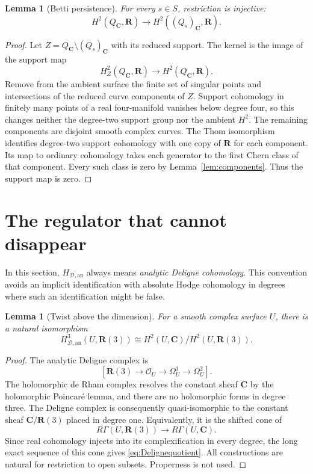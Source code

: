 \documentclass[11pt,a4paper]{article}
\newtheorem{lemma}[theorem]{Lemma}
\theoremstyle{remark}
\newcommand{\R}{\mathbf R}
\newcommand{\C}{\mathbf C}
\newcommand{\OO}{\mathcal O}
\newcommand{\HD}{H_{\mathcal D,\mathrm{an}}}
\begin{document}
\begin{lemma}[Betti persistence]\label{lem:Betti}
For every $s\in S$, restriction is injective:
\[
H^2(Q_{\C},\R)\longrightarrow H^2((Q_s)_{\C},\R).
\]
\end{lemma}
\begin{proof}
Let $Z=Q_{\C}\setminus(Q_s)_{\C}$ with its reduced support. The kernel is the image of the support map
\[
H_Z^2(Q_{\C},\R)\longrightarrow H^2(Q_{\C},\R).
\]
Remove from the ambient surface the finite set of singular points and intersections of the reduced curve components of $Z$. Support cohomology in finitely many points of a real four-manifold vanishes below degree four, so this changes neither the degree-two support group nor the ambient $H^2$. The remaining components are disjoint smooth complex curves. The Thom isomorphism identifies degree-two support cohomology with one copy of $\R$ for each component. Its map to ordinary cohomology takes each generator to the first Chern class of that component. Every such class is zero by Lemma~\ref{lem:components}. Thus the support map is zero.
\end{proof}

\section{The regulator that cannot disappear}

In this section, $\HD$ always means \emph{analytic Deligne cohomology}. This convention avoids an implicit identification with absolute Hodge cohomology in degrees where such an identification might be false.

\begin{lemma}[Twist above the dimension]\label{lem:Deligne}
For a smooth complex surface $U$, there is a natural isomorphism
\begin{equation}\label{eq:Delignequotient}
\HD^3(U,\R(3))
\cong H^2(U,\C)/H^2(U,\R(3)).
\end{equation}
\end{lemma}
\begin{proof}
The analytic Deligne complex is
\[
[\R(3)\longrightarrow\OO_U\longrightarrow\Omega_U^1\longrightarrow\Omega_U^2].
\]
The holomorphic de Rham complex resolves the constant sheaf $\C$ by the holomorphic Poincar\'e lemma, and there are no holomorphic forms in degree three. The Deligne complex is consequently quasi-isomorphic to the constant sheaf $\C/\R(3)$ placed in degree one. Equivalently, it is the shifted cone of
\[
R\Gamma(U,\R(3))\longrightarrow R\Gamma(U,\C).
\]
Since real cohomology injects into its complexification in every degree, the long exact sequence of this cone gives \eqref{eq:Delignequotient}. All constructions are natural for restriction to open subsets. Properness is not used.
\end{proof}
\end{document}

